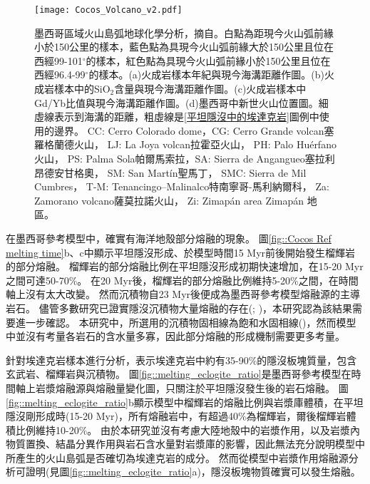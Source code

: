 \begin{figure*}[ht!]
    \centering
    \texttt{[image: Cocos\_Volcano\_v2.pdf]}
    \caption[墨西哥區域火山島弧地球化學分析，摘自\citet{ferrari2012dynamic}]{墨西哥區域火山島弧地球化學分析，摘自\citet{ferrari2012dynamic}。白點為距現今火山弧前緣小於150公里的樣本，藍色點為具現今火山弧前緣大於150公里且位在西經99-101$^{\circ}$的樣本，紅色點為具現今火山弧前緣小於150公里且位在西經96.4-99$^{\circ}$的樣本。(a)火成岩樣本年紀與現今海溝距離作圖。(b)火成岩樣本中的SiO$_2$含量與現今海溝距離作圖。(c)火成岩樣本中Gd/Yb比值與現今海溝距離作圖。(d)墨西哥中新世火山位置圖。細虛線表示到海溝的距離，粗虛線是\ref{平坦隱沒中的埃達克岩}圖例中使用的邊界。 CC: Cerro Colorado dome，CG: Cerro Grande volcan塞羅格蘭德火山， LJ: La Joya volcan拉霍亞火山， PH: Palo Huérfano 火山， PS: Palma Sola帕爾馬索拉，SA: Sierra de Angangueo塞拉利昂德安甘格奧， SM: San Martín聖馬丁， SMC: Sierra de Mil Cumbres， T-M: Tenancingo–Malinalco特南寧哥-馬利納爾科， Za: Zamorano volcano薩莫拉諾火山， Zi: Zimapán area Zimapán 地區。
    }
    \label{fig::Cocos_geochemisty}
\end{figure*}

在墨西哥參考模型中，確實有海洋地殼部分熔融的現象。
圖\ref{fig::Cocos Ref melting time}b、c中顯示平坦隱沒形成、於模型時間15 Myr前後開始發生榴輝岩的部分熔融。
榴輝岩的部分熔融比例在平坦隱沒形成初期快速增加，在15-20 Myr之間可達50-70$\%$。
在20 Myr後，榴輝岩的部分熔融比例維持5-20$\%$之間，在時間軸上沒有太大改變。
然而沉積物自23 Myr後便成為墨西哥參考模型熔融源的主導岩石。
儘管多數研究已證實隱沒沉積物大量熔融的存在(\citealp{van2011subduction}; \citealp{Forster2021})，本研究認為該結果需要進一步確認。
本研究中，所選用的沉積物固相線為飽和水固相線(\citealp{van2011subduction})，然而模型中並沒有考量各岩石的含水量多寡，因此部分熔融的形成機制需要更多考量。

\citet{stern1996role}針對埃達克岩樣本進行分析，表示埃達克岩中約有35-90$\%$的隱沒板塊質量，包含玄武岩、榴輝岩與沉積物。
圖\ref{fig::melting_eclogite_ratio}是墨西哥參考模型在時間軸上岩漿熔融源與熔融量變化圖，只關注於平坦隱沒發生後的岩石熔融。
圖\ref{fig::melting_eclogite_ratio}b顯示模型中榴輝岩的熔融比例與岩漿庫體積，在平坦隱沒剛形成時(15-20 Myr)，所有熔融岩中，有超過40$\%$為榴輝岩，爾後榴輝岩體積比例維持10-20$\%$。
由於本研究並沒有考慮大陸地殼中的岩漿作用，以及岩漿內物質置換、結晶分異作用與岩石含水量對岩漿庫的影響，因此無法充分說明模型中所產生的火山島弧是否確切為埃達克岩的成分。
然而從模型中岩漿作用熔融源分析可證明(見圖\ref{fig::melting_eclogite_ratio}a)，隱沒板塊物質確實可以發生熔融。

